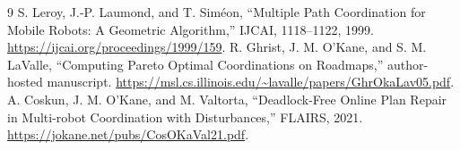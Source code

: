 \documentclass[11pt,a4paper]{article}
\begin{document}
\begin{thebibliography}{9}\small
{} S. Leroy, J.-P. Laumond, and T. Sim\'eon, ``Multiple Path
Coordination for Mobile Robots: A Geometric Algorithm,'' IJCAI, 1118--1122,
1999. \url{https://ijcai.org/proceedings/1999/159}.
 R. Ghrist, J. M. O'Kane, and S. M. LaValle, ``Computing
Pareto Optimal Coordinations on Roadmaps,'' author-hosted manuscript.
\url{https://msl.cs.illinois.edu/~lavalle/papers/GhrOkaLav05.pdf}.
 A. Coskun, J. M. O'Kane, and M. Valtorta, ``Deadlock-Free
Online Plan Repair in Multi-robot Coordination with Disturbances,'' FLAIRS,
2021. \url{https://jokane.net/pubs/CosOKaVal21.pdf}.
\end{thebibliography}
\end{document}
